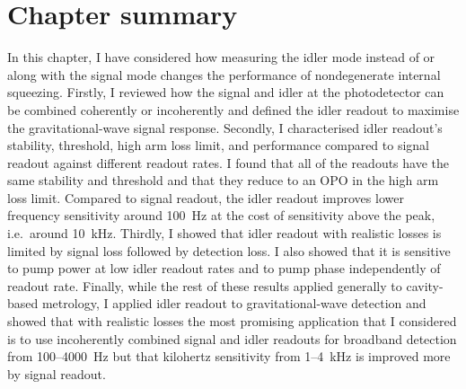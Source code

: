 \section{Chapter summary}

In this chapter, I have considered how measuring the idler mode instead of or along with the signal mode changes the performance of nondegenerate internal squeezing. %
Firstly, I reviewed how the signal and idler at the photodetector can be combined coherently or incoherently and defined the idler readout to maximise the gravitational-wave signal response.
Secondly, I characterised idler readout's stability, threshold, high arm loss limit, and performance compared to signal readout against different readout rates. I found that all of the readouts have the same stability and threshold and that they reduce to an OPO in the high arm loss limit. Compared to signal readout, the idler readout improves lower frequency sensitivity around 100~Hz at the cost of sensitivity above the peak, i.e.\ around 10~kHz.
Thirdly, I showed that idler readout with realistic losses is limited by signal loss followed by detection loss. I also showed that it is sensitive to pump power at low idler readout rates and to pump phase independently of readout rate.
Finally, while the rest of these results applied generally to cavity-based metrology, I applied idler readout to gravitational-wave detection and showed that with realistic losses the most promising application that I considered is to use incoherently combined signal and idler readouts for broadband detection from 100--4000~Hz  but that kilohertz sensitivity from 1--4~kHz is improved more by signal readout. 



